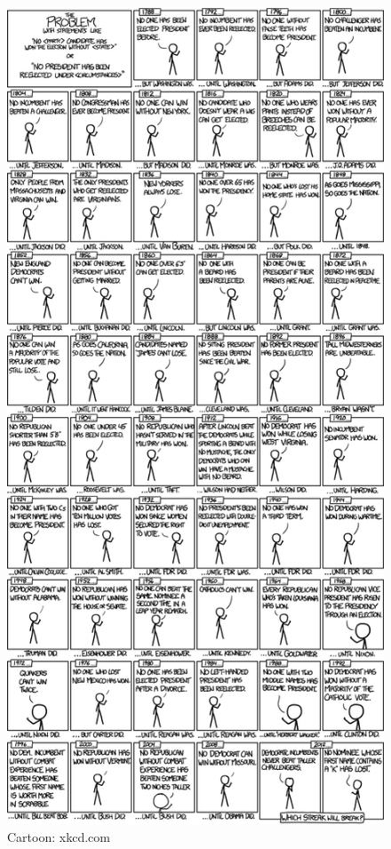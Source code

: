 \documentclass[]{article}
\theoremstyle{definition}
\theoremstyle{definition}
\theoremstyle{definition}
\theoremstyle{remark}
\begin{document}
\begin{figure}
\centering
\includegraphics{media/xkcd_presidents_overfitting.png}
\caption{Cartoon: xkcd.com}
\end{figure}
\end{document}
